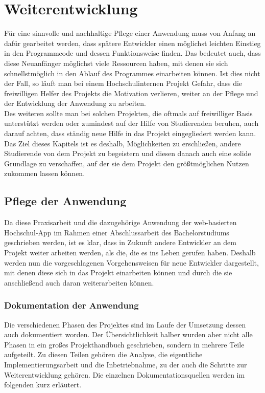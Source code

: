 \chapter{Weiterentwicklung}
\label{sec:weiterentwicklung}

Für eine sinnvolle und nachhaltige Pflege einer Anwendung muss von Anfang an dafür gearbeitet werden, dass spätere Entwickler einen möglichst leichten Einstieg in den Programmcode und dessen Funktionsweise finden. Das bedeutet auch, dass diese Neuanfänger möglichst viele Ressourcen haben, mit denen sie sich schnellstmöglich in den Ablauf des Programmes einarbeiten können. Ist dies nicht der Fall, so läuft man bei einem Hochschulinternen Projekt Gefahr, dass die freiwilligen Helfer des Projekts die Motivation verlieren, weiter an der Pflege und der Entwicklung der Anwendung zu arbeiten. \\
\linebreak
Des weiteren sollte man bei solchen Projekten, die oftmals auf freiwilliger Basis unterstützt werden oder zumindest auf der Hilfe von Studierenden beruhen, auch darauf achten, dass ständig neue Hilfe in das Projekt eingegliedert werden kann. Das Ziel dieses Kapitels ist es deshalb, Möglichkeiten zu erschließen, andere Studierende von dem Projekt zu begeistern und diesen danach auch eine solide Grundlage zu verschaffen, auf der sie dem Projekt den größtmöglichen Nutzen zukommen lassen können.

\section{Pflege der Anwendung}
\label{sec:pflege}

Da diese Praxisarbeit und die dazugehörige Anwendung der web-basierten Hoch\-schul-\ac{App} im Rahmen einer Abschlussarbeit des Bachelorstudiums geschrieben werden, ist es klar, dass in Zukunft andere Entwickler an dem Projekt weiter arbeiten werden, als die, die es ins Leben gerufen haben. Deshalb werden nun die vorgeschlagenen Vorgehensweisen für neue Entwickler dargestellt, mit denen diese sich in das Projekt einarbeiten können und durch die sie anschließend auch daran weiterarbeiten können.

\subsection*{Dokumentation der Anwendung}
\label{sec:anwendung_doku}

Die verschiedenen Phasen des Projektes sind im Laufe der Umsetzung dessen auch dokumentiert worden. Der Übersichtlichkeit halber wurden aber nicht alle Phasen in ein großes Projekthandbuch geschrieben, sondern in mehrere Teile aufgeteilt. Zu diesen Teilen gehören die Analyse, die eigentliche Implementierungsarbeit und die Inbetriebnahme, zu der auch die Schritte zur Weiterentwicklung gehören. Die einzelnen Dokumentationsquellen werden im folgenden kurz erläutert.

